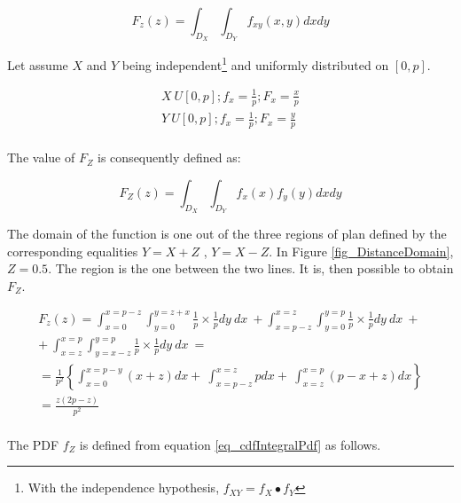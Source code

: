 \begin{equation}
F_z\left(z\right)=\int_{D_X}\int_{D_Y}{f_{xy}\left(x,y\right)dxdy}
\label{eq_Distance2}
\end{equation}

Let assume $X$ and $Y$ being independent\footnote{With the independence hypothesis, $f_{XY}=f_X\bullet f_Y$} and uniformly distributed on $[0,p]$. 

\begin{equation}
    \label{eq_Distance3}
    \begin{split}
    X~U\left[0,p\right];f_x=\frac{1}{p};F_x=\frac{x}{p} \\
    Y~U\left[0,p\right];f_x=\frac{1}{p};F_x=\frac{y}{p} \\
    \end{split}
\end{equation}

The value of $F_Z$ is consequently defined as:

\begin{equation}
F_Z(z)=\int_{D_X}\int_{D_Y}{f_x\left(x\right)f_y(y)dxdy}
\label{eq_Distance4}
\end{equation}

The domain of the function is one out of the three regions of plan defined by the corresponding equalities $Y=X+Z$ , $Y=X-Z$. In Figure \ref{fig_DistanceDomain}, $Z=0.5$. The region is the one between the two lines. It is, then possible to obtain $F_Z$. 
\begin{center}
\begin{equation}
    \label{eq_Distance5}
    \begin{split}
    F_z\left(z\right) =\int_{x=0}^{x=p-z}{\int_{y=0}^{y=z+x}{\frac{1}{p}\times\frac{1}{p}dy\ dx\ }}  + \int_{x=p-z}^{x=z}\int_{y=0}^{y=p}{\frac{1}{p}\times\frac{1}{p}dy\ dx\ }+ \\
    +\ \int_{x=z}^{x=p}{\int_{y=x-z}^{y=p}{\frac{1}{p}\times\frac{1}{p}dy\ dx\ }=} \\
    =\frac{1}{p^2}\left\{\int_{x=0}^{x=p-y}\left(x+z\right)dx+\ \int_{x=p-z}^{x=z}pdx+\ \int_{x=z}^{x=p}\left(p-x+z\right)dx\right\} \\
    =\frac{z\left(2p-z\right)}{p^2} \\
    \end{split}
\end{equation}
\end{center}


The PDF $f_Z$ is defined from equation \ref{eq_cdfIntegralPdf} as follows.


